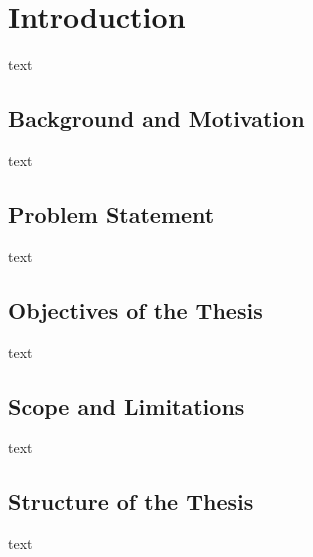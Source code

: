 \chapter{Introduction}
\label{ch:Introduction}
text

\section{Background and Motivation}
\label{sec:BackgroundMotivation}
text \par
\vspace{\baselineskip}
\noindent

\section{Problem Statement}
\label{sec:ProblemStatement}
text \par
\vspace{\baselineskip}
\noindent

\section{Objectives of the Thesis}
\label{sec:Objectives}
text \par
\vspace{\baselineskip}
\noindent

\section{Scope and Limitations}
\label{sec:ScopeLimitations}
text \par
\vspace{\baselineskip}
\noindent

\section{Structure of the Thesis}
\label{sec:Structure}
text \par
\vspace{\baselineskip}
\noindent
